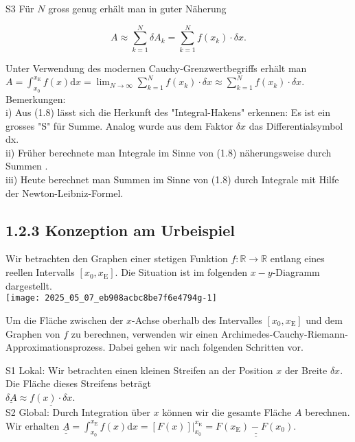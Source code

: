 \documentclass[10pt]{article}
\begin{document}
S3 Für $N$ gross genug erhält man in guter Näherung


\begin{equation*}
A \approx \sum_{k=1}^{N} \delta A_{k}=\sum_{k=1}^{N} f\left(x_{k}\right) \cdot \delta x . \tag{1.7}
\end{equation*}


Unter Verwendung des modernen Cauchy-Grenzwertbegriffs erhält man\\
$A=\int_{x_{0}}^{x_{\mathrm{E}}} f(x) \mathrm{d} x=\lim _{N \rightarrow \infty} \sum_{k=1}^{N} f\left(x_{k}\right) \cdot \delta x \approx \sum_{k=1}^{N} f\left(x_{k}\right) \cdot \delta x$.\\
Bemerkungen:\\
i) Aus (1.8) lässt sich die Herkunft des "Integral-Hakens" erkennen: Es ist ein grosses "S" für Summe. Analog wurde aus dem Faktor $\delta x$ das Differentialsymbol dx.\\
ii) Früher berechnete man Integrale im Sinne von (1.8) näherungsweise durch Summen .\\
iii) Heute berechnet man Summen im Sinne von (1.8) durch Integrale mit Hilfe der Newton-Leibniz-Formel.

\subsection*{1.2.3 Konzeption am Urbeispiel}
Wir betrachten den Graphen einer stetigen Funktion $f: \mathbb{R} \rightarrow \mathbb{R}$ entlang eines reellen Intervalls $\left[x_{0}, x_{\mathrm{E}}\right]$. Die Situation ist im folgenden $x-y$-Diagramm dargestellt.\\
\texttt{[image: 2025\_05\_07\_eb908acbc8be7f6e4794g-1]}

Um die Fläche zwischen der $x$-Achse oberhalb des Intervalles $\left[x_{0}, x_{\mathrm{E}}\right]$ und dem Graphen von $f$ zu berechnen, verwenden wir einen Archimedes-Cauchy-Riemann-Approximationsprozess. Dabei gehen wir nach folgenden Schritten vor.

S1 Lokal: Wir betrachten einen kleinen Streifen an der Position $x$ der Breite $\delta x$. Die Fläche dieses Streifens beträgt\\
$\underline{\delta A} \approx \underline{f(x) \cdot \delta x}$.\\
S2 Global: Durch Integration über $x$ können wir die gesamte Fläche $A$ berechnen. Wir erhalten $\underline{\underline{A}}=\int_{x_{0}}^{x_{\mathrm{E}}} f(x) \mathrm{d} x=\left.[F(x)]\right|_{x_{0}} ^{x_{\mathrm{E}}}=\underline{\underline{F\left(x_{\mathrm{E}}\right)-F\left(x_{0}\right) .}}$
\end{document}
